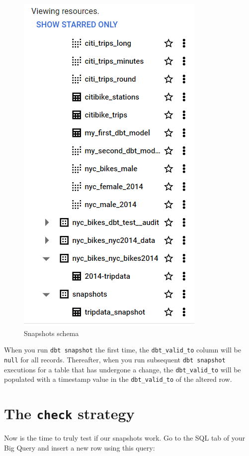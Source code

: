 \documentclass[
]{book}
\begin{document}
\begin{figure}
\centering
\includegraphics{./images/snapshots_schema.png}
\caption{Snapshots schema}
\end{figure}

When you run \texttt{dbt\ snapshot} the first time, the \texttt{dbt\_valid\_to} column will be \texttt{null} for all records. Thereafter, when you run subsequent \texttt{dbt\ snapshot} executions for a table that has undergone a change, the \texttt{dbt\_valid\_to} will be populated with a timestamp value in the \texttt{dbt\_valid\_to} of the altered row.

\hypertarget{the-check-strategy}{%
\section{\texorpdfstring{The \texttt{check} strategy}{The check strategy}}\label{the-check-strategy}}

Now is the time to truly test if our snapshots work. Go to the SQL tab of your Big Query and insert a new row using this query:
\end{document}
